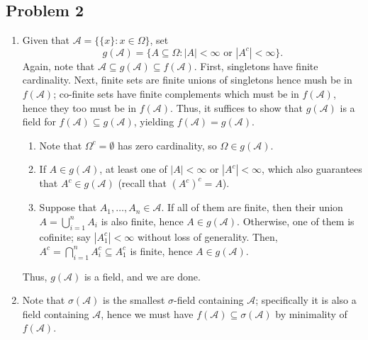 \documentclass[11pt]{article}
\begin{document}
    \subsection*{Problem 2}

    \begin{enumerate}
        \item Given that $\mathcal{A} = \{\{x\}\colon x \in \Omega\}$, set \[
            g(\mathcal{A}) = \{A\subseteq \Omega\colon |A| < \infty \text{ or } |A^c| < \infty\}.
        \] Again, note that $\mathcal{A} \subseteq g(\mathcal{A}) \subseteq
        f(\mathcal{A})$. First, singletons have finite cardinality. Next,
        finite sets are finite unions of singletons hence mush be in
        $f(\mathcal{A})$; co-finite sets have finite complements which must be
        in $f(\mathcal{A})$, hence they too must be in $f(\mathcal{A})$.
        Thus, it suffices to show that $g(\mathcal{A})$ is a field for
        $f(\mathcal{A}) \subseteq g(\mathcal{A})$, yielding $f(\mathcal{A}) =
        g(\mathcal{A})$.

        \begin{enumerate}
            \item Note that $\Omega^c = \emptyset$ has zero cardinality, so
            $\Omega \in g(\mathcal{A})$.

            \item If $A \in g(\mathcal{A})$, at least one of $|A| < \infty$ or
            $|A^c| < \infty$, which also guarantees that $A^c \in
            g(\mathcal{A})$ (recall that $(A^c)^c = A$).

            \item Suppose that $A_1, \dots, A_n \in \mathcal{A}$. If all of
            them are finite, then their union $A = \bigcup_{i = 1}^n A_i$ is
            also finite, hence $A \in g(\mathcal{A})$. Otherwise, one of them
            is cofinite; say $|A_1^c| < \infty$ without loss of generality.
            Then, $A^c = \bigcap_{i = 1}^n A_i^c \subseteq A_1^c$ is finite,
            hence $A \in g(\mathcal{A})$.
        \end{enumerate}

        Thus, $g(\mathcal{A})$ is a field, and we are done.


        \item Note that $\sigma(\mathcal{A})$ is the smallest $\sigma$-field
        containing $\mathcal{A}$; specifically it is also a field containing
        $\mathcal{A}$, hence we must have $f(\mathcal{A}) \subseteq
        \sigma(\mathcal{A})$ by minimality of $f(\mathcal{A})$.


\end{enumerate}
\end{document}
